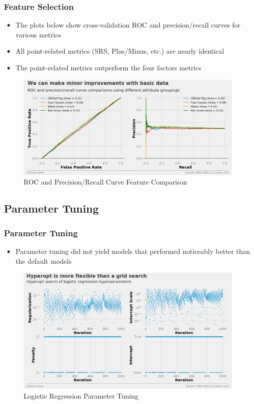 \documentclass{beamer}
\begin{document}
\begin{frame}
\frametitle{Feature Selection}
\begin{itemize}
    \item The plots below show cross-validation ROC and precision/recall curves for various metrics
    \item All point-related metrics (SRS, Plus/Minus, etc.) are nearly identical
    \item The point-related metrics outperform the four factors metrics
\end{itemize}
\begin{figure}
\includegraphics[scale=0.35]{../docs/assets/images/feature-selection/cross-validation-comparison.png}
\caption{ROC and Precision/Recall Curve Feature Comparison}
\end{figure}
\end{frame}

\subsection{Parameter Tuning}
\begin{frame}
\frametitle{Parameter Tuning}
\begin{itemize}
    \item Parameter tuning did not yield models that performed noticeably better than the default models
\end{itemize}
\begin{figure}
\includegraphics[scale=0.3]{../docs/assets/images/parameter-tuning/logistic-regression-hyperopt.png}
\caption{Logistic Regression Parameter Tuning}
\end{figure}
\end{frame}
\end{document}
